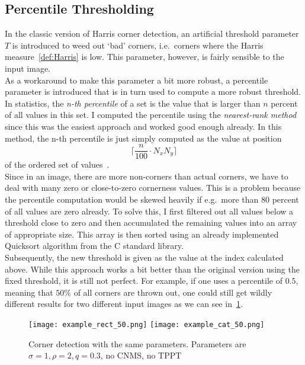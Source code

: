 \subsection{Percentile Thresholding}\label{sub:Percentile}
In the classic version of Harris corner detection, an artificial threshold parameter $T$
is introduced to weed out `bad' corners, i.e.\ corners where the \linebreak 
Harris measure~\eqref{def:Harris} is low. 
This parameter, however, is fairly sensible to the input image.\\
As a workaround to make this parameter a bit more robust, a percentile
parameter is introduced that is in turn used to compute a more robust threshold.\\
In statistics, the \textit{n-th percentile} of a set is the value that is larger than $n$ percent
of all values in this set.
I computed the percentile using the \textit{nearest-rank method} since this was the easiest
approach and worked good enough already. In this method, the n-th percentile is just simply
computed as the value at position 
\[
\lceil \frac{n}{100}\cdot N_{x}N_{y}\rceil
\] 
of the ordered set of values~\cite{percentile}.\\
Since in an image, there are more non-corners than actual corners, we have to deal with many zero
or close-to-zero cornerness values. This is a problem because the percentile computation would be skewed
heavily if e.g.\ more than 80 percent of all values are zero already. To solve this, I first filtered
out all values below a threshold close to zero and then accumulated the remaining values into an
array of appropriate size. This array is then sorted using an already implemented Quicksort
algorithm from the C standard library.\\
Subsequently, the new threshold is given as the value at
the index calculated above.
While this approach works a bit better than the original version using the fixed threshold, it is
still not perfect. For example, if one uses a percentile of $0.5$, meaning that 
$50\%$ of all corners are thrown out, one could still get wildly different results 
for two different input images as we can see in~\ref{fig:PercExample}.
\begin{figure}[h!]
    \centering
    \texttt{[image: example\_rect\_50.png]}
    \texttt{[image: example\_cat\_50.png]}
    \caption{Corner detection with the same parameters. Parameters are $\sigma=1,\rho=2,q=0.3$, no
    CNMS, no TPPT}\label{fig:PercExample}
\end{figure}\\
